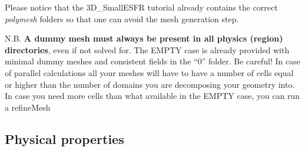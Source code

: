 Please notice that the 3\+D\+\_\+\+Small\+E\+S\+FR tutorial already contains the correct {\itshape polymesh} folders so that one can avoid the mesh generation step.

N.\+B. {\bfseries A dummy mesh must always be present in all physics (region) directories}, even if not solved for. The E\+M\+P\+TY case is already provided with minimal dummy meshes and consistent fields in the “0” folder. Be careful! In case of parallel calculations all your meshes will have to have a number of cells equal or higher than the number of domains you are decomposing your geometry into. In case you need more cells than what available in the E\+M\+P\+TY case, you can run a refine\+Mesh

\subsection*{Physical properties}

